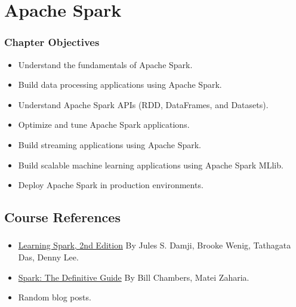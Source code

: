 \section{Apache Spark}

\begin{frame}
\frametitle{Chapter Objectives}

\begin{itemize}
	\item Understand the fundamentals of Apache Spark. \pause
	\item Build data processing applications using Apache Spark. \pause
	\item Understand Apache Spark APIs (RDD, DataFrames, and Datasets). \pause
	\item Optimize and tune Apache Spark applications. \pause
	\item Build streaming applications using Apache Spark. \pause
	\item Build scalable machine learning applications using Apache Spark MLlib. \pause
	\item Deploy Apache Spark in production environments. \pause
\end{itemize}

\end{frame}

\subsection{Course References}
\begin{frame}
	\frametitle{\subsecname}
	\begin{itemize}
		\item \href{https://pages.databricks.com/rs/094-YMS-629/images/LearningSpark2.0.pdf}{Learning Spark, 2nd Edition} By Jules S. Damji, Brooke Wenig, Tathagata Das, Denny Lee. \pause
		\item \href{https://learning.oreilly.com/library/view/spark-the-definitive/9781491912201/}{Spark: The Definitive Guide} By Bill Chambers, Matei Zaharia. \pause
		\item Random blog posts. \pause
	\end{itemize}
	\end{frame}

